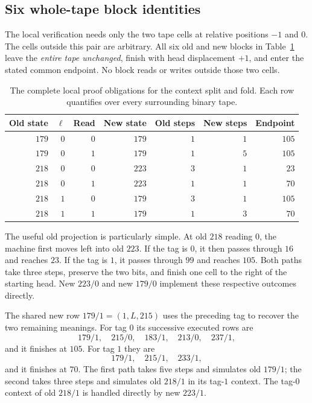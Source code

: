 \subsection{Six whole-tape block identities}

The local verification needs only the two tape cells at relative
positions $-1$ and $0$.  The cells outside this pair are arbitrary.
All six old and new blocks in Table~\ref{tab:239-blocks} leave the
\emph{entire tape unchanged}, finish with head displacement $+1$,
and enter the stated common endpoint.  No block reads or writes
outside those two cells.

\begin{table}[htbp]
\centering
\begin{tabular}{rrrrrrr}
Old state & $\ell$ & Read & New state & Old steps & New steps & Endpoint \\
\hline
$179$ & $0$ & $0$ & $179$ & $1$ & $1$ & $105$\\
$179$ & $0$ & $1$ & $179$ & $1$ & $5$ & $105$\\
$218$ & $0$ & $0$ & $223$ & $3$ & $1$ & $23$\\
$218$ & $0$ & $1$ & $223$ & $1$ & $1$ & $70$\\
$218$ & $1$ & $0$ & $179$ & $3$ & $1$ & $105$\\
$218$ & $1$ & $1$ & $179$ & $1$ & $3$ & $70$\\
\hline
\end{tabular}
\caption{The complete local proof obligations for the context split
and fold.  Each row quantifies over every surrounding binary tape.}
\label{tab:239-blocks}
\end{table}

The useful old projection is particularly simple.  At old $218$
reading $0$, the machine first moves left into old $223$.  If the
tag is $0$, it then passes through $16$ and reaches $23$.  If the
tag is $1$, it passes through $99$ and reaches $105$.  Both paths
take three steps, preserve the two bits, and finish one cell to the
right of the starting head.  New $223/0$ and new $179/0$ implement
these respective outcomes directly.

The shared new row $179/1=(1,L,215)$ uses the preceding tag to recover
the two remaining meanings.  For tag $0$ its successive executed rows are
\[
179/1,\quad 215/0,\quad 183/1,\quad 213/0,\quad 237/1,
\]
and it finishes at $105$.  For tag $1$ they are
\[
179/1,\quad 215/1,\quad 233/1,
\]
and it finishes at $70$.  The first path takes five steps and
simulates old $179/1$; the second takes three steps and simulates
old $218/1$ in its tag-$1$ context.  The tag-$0$ context of old
$218/1$ is handled directly by new $223/1$.


